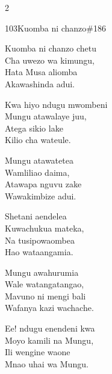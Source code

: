 \begin{multicols}{2}
\begin{hymn}{103}{Kuomba ni chanzo}{\#186}
\begin{stanza}
Kuomba ni chanzo chetu\\
Cha uwezo wa kimungu,\\
Hata Musa aliomba\\
Akawashinda adui.
\end{stanza}
\begin{stanza}
Kwa hiyo ndugu mwombeni\\
Mungu atawalaye juu,\\
Atega sikio lake\\
Kilio cha wateule.
\end{stanza}
\begin{stanza}
Mungu atawatetea\\
Wamliliao daima,\\
Atawapa nguvu zake\\
Wawakimbize adui.
\end{stanza}
\begin{stanza}
Shetani aendelea\\
Kuwachukua mateka,\\
Na tusipowaombea\\
Hao wataangamia.
\end{stanza}
\begin{stanza}
Mungu awahurumia\\
Wale watangatangao,\\
Mavuno ni mengi bali\\
Wafanya kazi wachache.
\end{stanza}
\begin{stanza}
Ee! ndugu enendeni kwa\\
Moyo kamili na Mungu,\\
Ili wengine waone\\
Mnao uhai wa Mungu.
\end{stanza}
\end{hymn}


\end{multicols}
